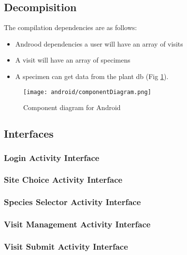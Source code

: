 \subsection{Decompisition}
	The compilation dependencies are as follows:
	\begin{itemize}
		\item Androod dependencies a user will have an array of visits
		\item A visit will have an array of specimens
		\item A specimen can get data from the plant db (Fig \ref{fig:androidComponentDiagram}).
	\end{itemize}
	
	\begin{figure}
		\centering
			\texttt{[image: android/componentDiagram.png]}
		\caption{Component diagram for Android}
		\label{fig:androidComponentDiagram}
	\end{figure}

\newpage
\subsection{Interfaces}
	\subsubsection{Login Activity Interface}
		

	\newpage
	\subsubsection{Site Choice Activity Interface}
		

	\newpage
	\subsubsection{Species Selector Activity Interface}
		

	\newpage
	\subsubsection{Visit Management Activity Interface}
		

	\newpage
	\subsubsection{Visit Submit Activity Interface}
		

